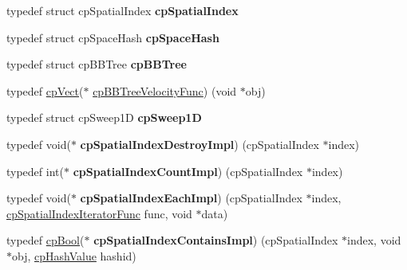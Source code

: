 \begin{DoxyCompactItemize}
typedef struct cp\+Spatial\+Index {\bfseries cp\+Spatial\+Index}
\item 
\mbox{\label{group__cpSpatialIndex_ga3ff6ff3229f67d50c8a936fce831e047}} 
typedef struct cp\+Space\+Hash {\bfseries cp\+Space\+Hash}
\item 
\mbox{\label{group__cpSpatialIndex_ga8347b442aab8cc34989d11220846260a}} 
typedef struct cp\+B\+B\+Tree {\bfseries cp\+B\+B\+Tree}
\item 
typedef \hyperlink{structcpVect}{cp\+Vect}($\ast$ \hyperlink{group__cpSpatialIndex_ga5e805ddbe3cab9b92a6fbd933ff6e6b0}{cp\+B\+B\+Tree\+Velocity\+Func}) (void $\ast$obj)
\item 
\mbox{\label{group__cpSpatialIndex_gad24eda1cd6772ea93a036c766b787c3b}} 
typedef struct cp\+Sweep1D {\bfseries cp\+Sweep1D}
\item 
\mbox{\label{group__cpSpatialIndex_gaaaf3c06d9176031f22ccd1f69a760ebb}} 
typedef void($\ast$ {\bfseries cp\+Spatial\+Index\+Destroy\+Impl}) (cp\+Spatial\+Index $\ast$index)
\item 
\mbox{\label{group__cpSpatialIndex_gae98eded3b672a84bdae64ff61476d096}} 
typedef int($\ast$ {\bfseries cp\+Spatial\+Index\+Count\+Impl}) (cp\+Spatial\+Index $\ast$index)
\item 
\mbox{\label{group__cpSpatialIndex_ga7c2c2ed1234f45f8b3e50cb79d23f882}} 
typedef void($\ast$ {\bfseries cp\+Spatial\+Index\+Each\+Impl}) (cp\+Spatial\+Index $\ast$index, \hyperlink{group__cpSpatialIndex_ga522e250b59a1802d3648085685d41f97}{cp\+Spatial\+Index\+Iterator\+Func} func, void $\ast$data)
\item 
\mbox{\label{group__cpSpatialIndex_gad729c7d8dd9cd247b35727fc2aa2bc84}} 
typedef \hyperlink{group__basicTypes_gabc5e752c48f3449ca26ef413ecbd647e}{cp\+Bool}($\ast$ {\bfseries cp\+Spatial\+Index\+Contains\+Impl}) (cp\+Spatial\+Index $\ast$index, void $\ast$obj, \hyperlink{group__basicTypes_gae7eb4775a9f43914a15553ca65a048f4}{cp\+Hash\+Value} hashid)
\item 
\mbox{\label{group__cpSpatialIndex_gab1a1e7d307a79fc97d47189bb0aea8a9}} 

\end{DoxyCompactItemize}
